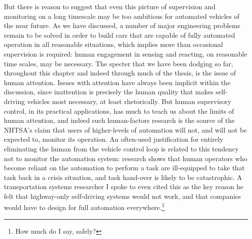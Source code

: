 But there is reason to suggest that even this picture of supervision
and monitoring on a long timescale may be too ambitious for automated
vehicles of the near future. As we have discussed, a number of major
engineering problems remain to be solved in order to build cars that
are capable of fully automated operation in all reasonable situations,
which implies more than occasional supervision is required: human engagement in
sensing and reacting, on reasonable time scales, may be necessary. The
specter that we have been dodging so far, throughout this chapter and
indeed through much of the thesis, is the issue of human attention.
Issues with attention have always been implicit within the discussion,
since inattention is precisely the human quality that makes
self-driving vehicles most necessary, at least rhetorically. But human
supervisory control, in its practical applications, has much to teach
us about the limits of human attention, and indeed such human-factors
research is the source of the NHTSA's claim that users of
higher-levels of automation will not, and will not be expected to,
monitor its operation. An often-used justification
for entirely eliminating the human from the vehicle control loop is
related to this tendency not to monitor the automation system:
research shows that human operators who become reliant on the
automation to perform a task are ill-equipped to take that task back
in a crisis situation, and task hand-over is likely to be
catastrophic.\cite{???} A transportation systems researcher I spoke to
even cited this as the key reason he felt that highway-only
self-driving systems would not work, and that companies would have to
design for full automation everywhere.\footnote{How much do I say,
  safely?} 

